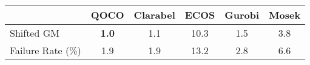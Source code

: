 \begin{tabular}{lccccc}
  \hline
   & \textbf{QOCO} & \textbf{Clarabel} & \textbf{ECOS} & \textbf{Gurobi} & \textbf{Mosek} \\ \hline
  Shifted GM & \textbf{1.0} & 1.1 & 10.3 & 1.5 & 3.8 \\ 
  Failure Rate (\%) & 1.9 & 1.9 & 13.2 & 2.8 & 6.6 \\ \hline 
\end{tabular}
